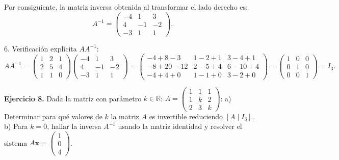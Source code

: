 \documentclass[11pt,letterpaper]{article}
\theoremstyle{definition}
\theoremstyle{plain}
\newcommand{\R}{\mathbb{R}}
\newcommand{\vv}[1]{\mathbf{#1}}
\begin{document}
Por consiguiente, la matriz inversa obtenida al transformar el lado derecho es:
\[
A^{-1} = \begin{pmatrix} -4 & 1 & 3 \\ 4 & -1 & -2 \\ -3 & 1 & 1 \end{pmatrix}.
\]

6. Verificación explícita $A A^{-1}$:
\[
A A^{-1} = \begin{pmatrix} 1 & 2 & 1 \\ 2 & 5 & 4 \\ 1 & 1 & 0 \end{pmatrix} \begin{pmatrix} -4 & 1 & 3 \\ 4 & -1 & -2 \\ -3 & 1 & 1 \end{pmatrix} = \begin{pmatrix} -4+8-3 & 1-2+1 & 3-4+1 \\ -8+20-12 & 2-5+4 & 6-10+4 \\ -4+4+0 & 1-1+0 & 3-2+0 \end{pmatrix} = \begin{pmatrix} 1 & 0 & 0 \\ 0 & 1 & 0 \\ 0 & 0 & 1 \end{pmatrix} = I_3.
\]

\vspace{0.3cm}
\textbf{Ejercicio 8.} Dada la matriz con parámetro $k \in \R$: $A = \begin{pmatrix} 1 & 1 & 1 \\ 1 & k & 2 \\ 2 & 3 & k \end{pmatrix}$:
a) Determinar para qué valores de $k$ la matriz $A$ es invertible reduciendo $[A \mid I_3]$.
b) Para $k=0$, hallar la inversa $A^{-1}$ usando la matriz identidad y resolver el sistema $A\vv{x} = \begin{pmatrix} 1 \\ 0 \\ 4 \end{pmatrix}$.
\end{document}

